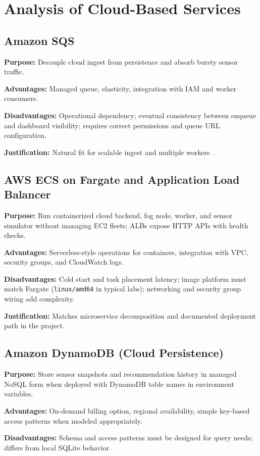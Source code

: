 \documentclass[conference]{IEEEtran}
\begin{document}
\section{Analysis of Cloud-Based Services}

\subsection{Amazon SQS}
\textbf{Purpose:} Decouple cloud ingest from persistence and absorb bursty sensor traffic.

\textbf{Advantages:} Managed queue, elasticity, integration with IAM and worker consumers.

\textbf{Disadvantages:} Operational dependency; eventual consistency between enqueue and dashboard visibility; requires correct permissions and queue URL configuration.

\textbf{Justification:} Natural fit for scalable ingest and multiple workers~\cite{sqsdocs}.

\subsection{AWS ECS on Fargate and Application Load Balancer}
\textbf{Purpose:} Run containerized cloud backend, fog node, worker, and sensor simulator without managing EC2 fleets; ALBs expose HTTP APIs with health checks.

\textbf{Advantages:} Serverless-style operations for containers, integration with VPC, security groups, and CloudWatch logs.

\textbf{Disadvantages:} Cold start and task placement latency; image platform must match Fargate (\texttt{linux/amd64} in typical labs); networking and security group wiring add complexity.

\textbf{Justification:} Matches microservice decomposition and documented deployment path in the project.

\subsection{Amazon DynamoDB (Cloud Persistence)}
\textbf{Purpose:} Store sensor snapshots and recommendation history in managed NoSQL form when deployed with DynamoDB table names in environment variables.

\textbf{Advantages:} On-demand billing option, regional availability, simple key-based access patterns when modeled appropriately.

\textbf{Disadvantages:} Schema and access patterns must be designed for query needs; differs from local SQLite behavior.
\end{document}
